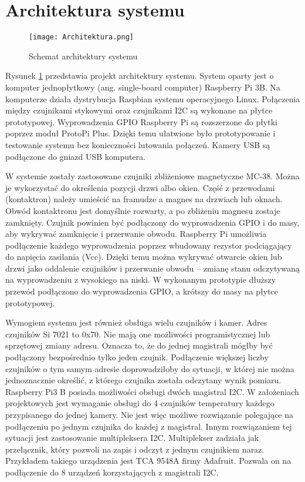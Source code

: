 \documentclass[a4paper,12pt,twoside]{article}
\begin{document}
\section{Architektura systemu}

\begin{figure}[h]
\texttt{[image: Architektura.png]}
\caption{Schemat architektury systemu}
\label{fig: architektura}
\end{figure}

Rysunek \ref{fig: architektura} przedstawia projekt architektury systemu. System oparty jest o komputer jednopłytkowy (ang. single-board computer) Raspberry Pi 3B. Na komputerze działa dystrybucja Raspbian systemu operacyjnego Linux. Połączenia między czujnikami stykowymi oraz czujnikami I2C są wykonane na płytce prototypowej. Wyprowadzenia GPIO Raspberry Pi są rozszerzone do płytki poprzez moduł ProtoPi Plus. Dzięki temu ułatwione było prototypowanie i testowanie systemu bez konieczności lutowania połączeń. Kamery USB są podłączone do gniazd USB komputera.

W systemie zostały zastosowane czujniki zbliżeniowe magnetyczne MC-38. Można je wykorzystać do określenia pozycji drzwi albo okien. Część z przewodami (kontaktron) należy umieścić na framudze a magnes na drzwiach lub oknach. Obwód kontaktronu jest domyślnie rozwarty, a po zbliżeniu magnesu zostaje zamknięty. Czujnik powinien być podłączony do wyprowadzenia GPIO i do masy, aby wykrywać zamknięcie i przerwanie obwodu. Raspberry Pi umożliwia podłączenie każdego wyprowadzenia poprzez wbudowany rezystor podciągający do napięcia zasilania (Vcc). Dzięki temu można wykrywać otwarcie okien lub drzwi jako oddalenie czujników i przerwanie obwodu -- zmianę stanu odczytywaną na wyprowadzeniu z wysokiego na niski. W wykonanym prototypie dłuższy przewód podłączono do wyprowadzenia GPIO, a krótszy do masy na płytce prototypowej. 

Wymogiem systemu jest również obsługa wielu czujników i kamer. Adres czujników Si 7021 to 0x70. Nie mają one możliwości programistycznej lub sprzętowej zmiany adresu. Oznacza to, że do jednej magistrali mógłby być podłączony bezpośrednio tylko jeden czujnik. Podłączenie większej liczby czujników o tym samym adresie doprowadziłoby do sytuacji, w której nie można jednoznacznie określić, z którego czujnika została odczytany wynik pomiaru. Raspberry Pi3 B posiada możliwości obsługi dwóch magistral I2C. W założeniach projektowych jest wymaganie obsługi do 4 czujników temperatury każdego przypisanego do jednej kamery. Nie jest więc możliwe rozwiązanie polegające na podłączeniu po jednym czujnika do każdej z magistral. Innym rozwiązaniem tej sytuacji jest zastosowanie multipleksera I2C. Multiplekser zadziała jak przełącznik, który pozwoli na zapis i odczyt z jednym czujnikiem naraz. Przykładem takiego urządzenia jest TCA 9548A firmy Adafruit. Pozwala on na podłączenie do 8 urządzeń korzystających z magistrali I2C.
\end{document}
